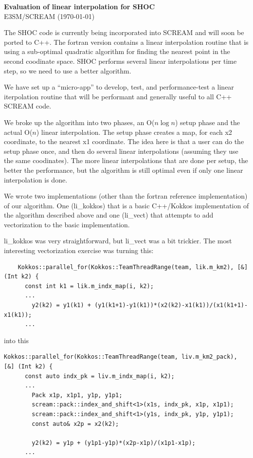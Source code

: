 \documentclass[10pt,twocolumn]{article}
\begin{document}
\sloppy

\onecolumn

\begin{center}
  {\bf Evaluation of linear interpolation for SHOC} \\
  E3SM/SCREAM (\today)
\end{center}


The SHOC code is currently being incorporated into SCREAM and will soon be ported to
C++. The fortran version contains a linear interpolation routine that is using a
sub-optimal quadratic algorithm for finding the nearest point in the second coodinate
space. SHOC performs several linear interpolations per time step, so we need to
use a better algorithm.

We have set up a ``micro-app'' to develop, test, and performance-test a linear
iterpolation routine that will be performant and generally useful to all C++ SCREAM
code.


We broke up the algorithm into two phases, an O($n \log n$) setup phase and the actual
O($n$) linear interpolation. The setup phase creates a map, for each x2 coordinate, to
the nearest x1 coordinate. The idea here is that a user can do the setup phase once, and
then do several linear interpolations (assuming they use the same coodinates). The more
linear interpolations that are done per setup, the better the performance, but the algorithm
is still optimal even if only one linear interpolation is done.

We wrote two implementations (other than the fortran reference implementation) of our
algorithm. One (li\_kokkos) that is a basic C++/Kokkos implementation of the algorithm
described above and one (li\_vect) that attempts to add vectorization to the basic implementation.

li\_kokkos was very straightforward, but li\_vect was a bit trickier. The most interesting
vectorization exercise was turning this:


\begin{verbatim}
    Kokkos::parallel_for(Kokkos::TeamThreadRange(team, lik.m_km2), [&] (Int k2) {
      const int k1 = lik.m_indx_map(i, k2);
      ...
        y2(k2) = y1(k1) + (y1(k1+1)-y1(k1))*(x2(k2)-x1(k1))/(x1(k1+1)-x1(k1));
      ...
\end{verbatim}

into this

\begin{verbatim}
Kokkos::parallel_for(Kokkos::TeamThreadRange(team, liv.m_km2_pack), [&] (Int k2) {
      const auto indx_pk = liv.m_indx_map(i, k2);
      ...
        Pack x1p, x1p1, y1p, y1p1;
        scream::pack::index_and_shift<1>(x1s, indx_pk, x1p, x1p1);
        scream::pack::index_and_shift<1>(y1s, indx_pk, y1p, y1p1);
        const auto& x2p = x2(k2);

        y2(k2) = y1p + (y1p1-y1p)*(x2p-x1p)/(x1p1-x1p);
      ...
\end{verbatim}
\end{document}
